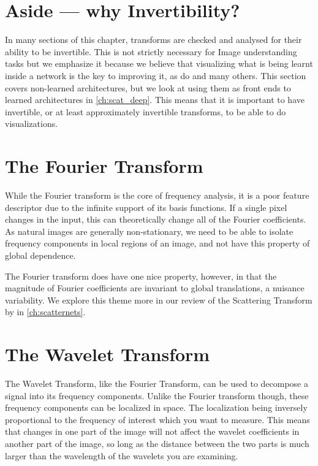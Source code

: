 \section{Aside --- why Invertibility?}
  In many sections of this chapter, transforms are checked and analysed for
  their ability to be invertible. This is not strictly necessary for Image
  understanding tasks but we emphasize it because we believe that
  visualizing what is being learnt inside a network is the key to improving
  it, as do \citet{zeiler_visualizing_compact_2014} and many others. This section
  covers non-learned architectures, but we look at using them as front ends to
  learned architectures in \autoref{ch:scat_deep}. This means that it is
  important to have invertible, or at least approximately invertible
  transforms, to be able to do visualizations. 


\section{The Fourier Transform}
  While the Fourier transform is the core of frequency analysis, it is a poor
  feature descriptor due to the infinite support of its basis functions. If
  a single pixel changes in the input, this can theoretically change all of the
  Fourier coefficients. As natural images are generally non-stationary, we need
  to be able to isolate frequency components in local regions of an image, and
  not have this property of global dependence.

  The Fourier transform does have one nice property, however, in that the magnitude of
  Fourier coefficients are invariant to global translations, a nuisance
  variability. We explore this theme more in our review of the Scattering
  Transform by \Mallat in \autoref{ch:scatternets}.

\section{The Wavelet Transform}
  The Wavelet Transform, like the Fourier Transform, can be used to decompose
  a signal into its frequency components. Unlike the Fourier transform though,
  these frequency components can be localized in space. The localization
  being inversely proportional to the frequency of interest which you want to
  measure. This means that changes in one part of the image will not affect the
  wavelet coefficients in another part of the image, so long as the distance
  between the two parts is much larger than the wavelength of the wavelets you
  are examining.

